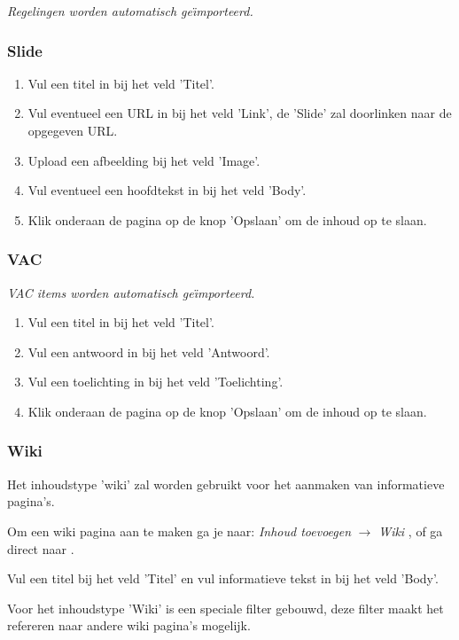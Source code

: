 \emph{Regelingen worden automatisch ge{\"\i}mporteerd.}

\subsubsection{Slide}\label{slide}

\begin{enumerate}
\item Vul een titel in bij het veld 'Titel'.
\item Vul eventueel een URL in bij het veld 'Link', de 'Slide' zal doorlinken naar de opgegeven URL.
\item Upload een afbeelding bij het veld 'Image'.
\item Vul eventueel een hoofdtekst in bij het veld 'Body'.
\item Klik onderaan de pagina op de knop 'Opslaan' om de inhoud op te slaan.
\end{enumerate}

\subsubsection{VAC}\label{vac}

\emph{VAC items worden automatisch ge{\"\i}mporteerd.}

\begin{enumerate}
\item Vul een titel in bij het veld 'Titel'.
\item Vul een antwoord in bij het veld 'Antwoord'.
\item Vul een toelichting in bij het veld 'Toelichting'.
\item Klik onderaan de pagina op de knop 'Opslaan' om de inhoud op te slaan.
\end{enumerate}

\subsubsection{Wiki}\label{wiki}
Het inhoudstype 'wiki' zal worden gebruikt voor het aanmaken van informatieve pagina's.

Om een wiki pagina aan te maken ga je naar: \emph{Inhoud toevoegen} $\rightarrow$ \emph{Wiki} , of ga direct naar .

Vul een titel bij het veld 'Titel' en vul informatieve tekst in bij het veld 'Body'.

Voor het inhoudstype 'Wiki' is een speciale filter gebouwd, deze filter maakt het refereren naar andere wiki pagina's mogelijk. 

